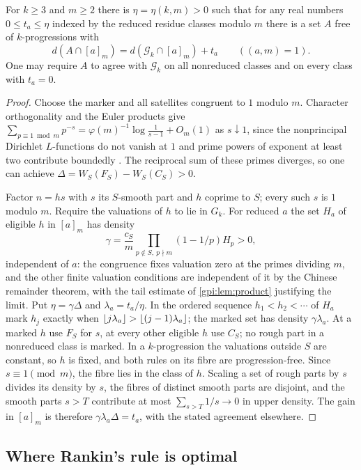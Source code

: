 \begin{theorem}\label{gpi:thm:kresidues}
For $k\ge3$ and $m\ge2$ there is $\eta=\eta(k,m)>0$ such that for any real numbers
$0\le t_a\le\eta$ indexed by the reduced residue classes modulo $m$ there is a set $A$ free of
$k$-progressions with
\[
 d(A\cap[a]_m)=d(\mathcal G_k\cap[a]_m)+t_a\qquad((a,m)=1).
\]
One may require $A$ to agree with $\mathcal G_k$ on all nonreduced classes and on every class with
$t_a=0$.
\end{theorem}
\begin{proof}
Choose the marker and all satellites congruent to $1$ modulo $m$. Character orthogonality and the
Euler products give $\sum_{p\equiv1\bmod m}p^{-s}=\varphi(m)^{-1}\log\frac1{s-1}+O_m(1)$ as
$s\downarrow1$, since the nonprincipal Dirichlet $L$-functions do not vanish at $1$ and prime powers
of exponent at least two contribute boundedly \cite{Sutherland2021Dirichlet}. The reciprocal sum of
these primes diverges, so one can achieve $\Delta=W_S(F_S)-W_S(C_S)>0$.

Factor $n=hs$ with $s$ its $S$-smooth part and $h$ coprime to $S$; every such $s$ is $1$ modulo $m$.
Require the valuations of $h$ to lie in $G_k$. For reduced $a$ the set $H_a$ of eligible $h$ in
$[a]_m$ has density
\[
 \gamma=\frac{c_S}m\prod_{p\notin S,\ p\nmid m}(1-1/p)H_p>0,
\]
independent of $a$: the congruence fixes valuation zero at the primes dividing $m$, and the other
finite valuation conditions are independent of it by the Chinese remainder theorem, with the tail
estimate of \cref{gpi:lem:product} justifying the limit. Put $\eta=\gamma\Delta$ and
$\lambda_a=t_a/\eta$. In the ordered sequence $h_1<h_2<\cdots$ of $H_a$ mark $h_j$ exactly when
$\lfloor j\lambda_a\rfloor>\lfloor(j-1)\lambda_a\rfloor$; the marked set has density $\gamma\lambda_a$. At a marked $h$
use $F_S$ for $s$, at every other eligible $h$ use $C_S$; no rough part in a nonreduced class is
marked. In a $k$-progression the valuations outside $S$ are constant, so $h$ is fixed, and both
rules on its fibre are progression-free. Since $s\equiv1\pmod m$, the fibre lies in the class of $h$.
Scaling a set of rough parts by $s$ divides its density by $s$, the fibres of distinct smooth parts
are disjoint, and the smooth parts $s>T$ contribute at most $\sum_{s>T}1/s\to0$ in upper density.
The gain in $[a]_m$ is therefore $\gamma\lambda_a\Delta=t_a$, with the stated agreement elsewhere.
\end{proof}

\subsection{Where Rankin's rule is optimal}\label{gpi:sec:restricted}
{\raggedright{}}

